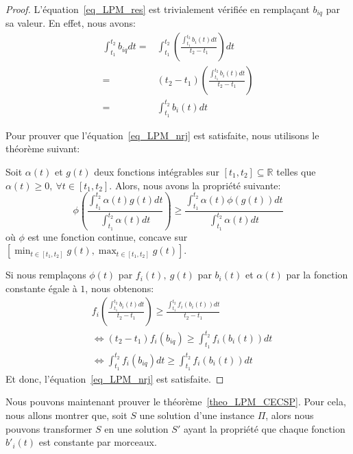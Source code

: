 \begin{proof}
  L'équation~\eqref{eq_LPM_res} est trivialement vérifiée en remplaçant
  $b_{iq}$ par sa valeur. En effet, nous avons:
  \begin{align*}
    \int_{t_1}^{t_2}b_{iq}dt =&
    \int_{t_1}^{t_2}\left(\frac{\int_{t_1}^{t_2}b_i(t)dt}{t_2-t_1}\right)dt\\
    =& (t_2-t_1)\left(\frac{\int_{t_1}^{t_2}b_i(t)dt}{t_2-t_1}\right)\\
    =&\int_{t_1}^{t_2}b_i(t)dt
  \end{align*}

  Pour prouver que l'équation~\eqref{eq_LPM_nrj} est satisfaite,
  nous utilisons le théorème suivant:  
  \begin{theo}
    Soit $\alpha(t)$ et $g(t)$ deux fonctions intégrables sur
    $[t_1,t_2] \subseteq \mathbb{R}$ telles que $\alpha(t) \ge 0,\
    \forall t \in [t_1,t_2]$. Alors, nous avons la propriété suivante: 
    \begin{equation}
      \phi\left( \frac{\int_{t_1}^{t_2} \alpha(t)g(t)dt }
        {\int_{t_1}^{t_2} \alpha(t)dt} \right) \ge
      \frac{\int_{t_1}^{t_2} \alpha(t)\phi(g(t))dt }
      {\int_{t_1}^{t_2} \alpha(t)dt}
    \end{equation}
    où $\phi$ est une fonction continue, concave sur $[\min_{t \in
      [t_1,t_2]} g(t),\max_{t \in [t_1,t_2]} g(t)]$. 
  \end{theo}
  Si nous remplaçons $\phi(t)$ par $f_i(t),\ g(t)$ par $b_i(t)$ et
  $\alpha(t)$ par la fonction constante égale à $1$, nous obtenons:
  \begin{align*}
    & f_i\left( \frac{\int_{t_1}^{t_2}b_i(t)dt }
      {t_2-t_1} \right) \ge
      \frac{\int_{t_1}^{t_2}f_i(b_i(t))dt }
      {t_2-t_1} \\
    & \Leftrightarrow (t_2-t_1)f_i\left( 
      b_{iq} \right) \ge
      \int_{t_1}^{t_2}f_i(b_i(t))dt\\
    & \Leftrightarrow \int_{t_1}^{t_2}f_i\left( 
      b_{iq} \right)dt \ge
      \int_{t_1}^{t_2}f_i(b_i(t))dt
  \end{align*}
Et donc, l'équation~\eqref{eq_LPM_nrj} est satisfaite.  
\end{proof}  

Nous pouvons maintenant prouver le théorème~\ref{theo_LPM_CECSP}. Pour
cela, nous allons montrer que, soit $S$ une solution d'une instance
$\Pi$, alors nous pouvons transformer $S$ en une solution $S'$ ayant
la propriété que chaque fonction $b'_i(t)$ est constante par morceaux.

